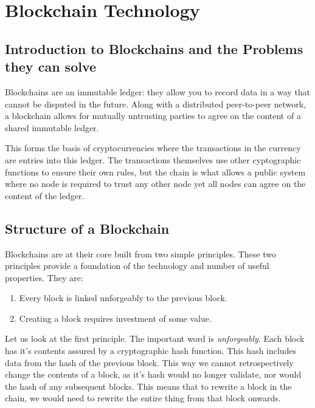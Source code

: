 
\chapter{Blockchain Technology}
\label{ch:blockchain}

\section{Introduction to Blockchains and the Problems they can solve}
\label{ch:blockchain:intro}

Blockchains are an immutable ledger: they allow you to record data in a way that cannot be disputed in the future. Along with a distributed peer-to-peer network, a blockchain allows for mutually untrusting parties to agree on the content of a shared immutable ledger.

This forms the basis of cryptocurrencies where the transactions in the currency are entries into this ledger. The transactions themselves use other cyptographic functions to ensure their own rules, but the chain is what allows a public system where no node is required to trust any other node yet all nodes can agree on the content of the ledger.


\section{Structure of a Blockchain}
\label{ch:blockchain:structure}

Blockchains are at their core built from two simple principles. These two principles provide a foundation of the technology and number of useful properties. They are:

\begin{enumerate}
    \item Every block is linked unforgeably to the previous block.
    \item Creating a block requires investment of some value.
\end{enumerate}

Let us look at the first principle. The important word is \emph{unforgeably}. Each block has it's contents assured by a cryptographic hash function. This hash includes data from the hash of the previous block. This way we cannot retrospectively change the contents of a block, as it's hash would no longer validate, nor would the hash of any subsequent blocks. This means that to rewrite a block in the chain, we would need to rewrite the entire thing from that block onwards.

